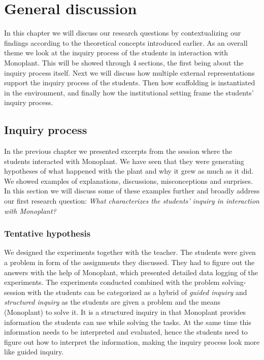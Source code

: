 \chapter{General discussion}
In this chapter we will discuss our research questions by contextualizing our findings according to the theoretical concepts introduced earlier. As an overall theme we look at the inquiry process of the students in interaction with Monoplant. This will be showed through 4 sections, the first being about the inquiry process itself. Next we will discuss how multiple external representations support the inquiry process of the students. Then how scaffolding is instantiated in the environment, and finally how the institutional setting frame the students' inquiry process.


\section{Inquiry process}
In the previous chapter we presented excerpts from the session where the students interacted with Monoplant. We have seen that they were generating hypotheses of what happened with the plant and why it grew as much as it did. We showed examples of explanations, discussions, misconceptions and surprises. In this section we will discuss some of these examples further and broadly address our first research question: \emph{What characterizes the students' inquiry in interaction with Monoplant?}

\subsection{Tentative hypothesis}
We designed the experiments together with the teacher. The students were given a problem in form of the assignments they discussed. They had to figure out the answers with the help of Monoplant, which presented detailed data logging of the experiments. The experiments conducted combined with the problem solving-session with the students can be categorized as a hybrid of \emph{guided inquiry} and \emph{structured inquiry} \citetext{\citealp{staver1987analysis}, referenced in \citealp{prince2006inductive}} as the students are given a problem and the means (Monoplant) to solve it. It is a structured inquiry in that Monoplant provides information  the students can use while solving the tasks. At the same time this information needs to be interpreted and evaluated, hence the students need to figure out how to interpret the information, making the inquiry process look more like guided inquiry.

